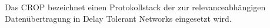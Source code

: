 Das CROP bezeichnet einen Protokollstack
der zur relevanceabh{\"a}ngigen Daten{\"u}bertragung in Delay Tolerant Networks
eingesetzt wird. 
